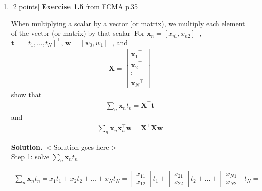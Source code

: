\documentclass[10pt]{article}
\begin{document}
\begin{enumerate}
\item \label{prob:5} [2 points]
{\bf Exercise 1.5} from FCMA p.35  %

When multiplying a scalar by a vector (or matrix), we multiply each element of the vector (or matrix) by that scalar.  For $\mathbf{x}_n = {[ x_{n1}, x_{n2} ]}^\top$, $\mathbf{t} = {[ t_1,...,t_N ]}^\top$, $\mathbf{w} = {[ w_0, w_1 ]}^\top$, and
\begin{eqnarray*}
\mathbf{X} = 
    \begin{bmatrix}
    {\mathbf{x}_{1}}^\top \\[0.3em]
    {\mathbf{x}_{2}}^\top \\[0.3em]
    \vdots \\[0.3em]
    {\mathbf{x}_{N}}^\top
    \end{bmatrix}
\end{eqnarray*}
show that
\begin{eqnarray*}
\sum_{n} \mathbf{x}_n t_n = \mathbf{X}^\top\mathbf{t}
\end{eqnarray*}
and
\begin{eqnarray*}
\sum_{n} \mathbf{x}_n \mathbf{x}_n ^\top \mathbf{w} = \mathbf{X}^\top\mathbf{X} \mathbf{w}
\end{eqnarray*}

{\bf Solution.} $<$Solution goes here$>$\\

Step 1: solve $\sum_{n} \mathbf{x}_n t_n$

\begin{eqnarray*}
\sum_{n} \mathbf{x}_n t_n = 
x_1t_1 + x_2t_2 + \dots + x_Nt_N =
    \begin{bmatrix}
	x_{11} \\[0.3em]
    x_{12}
    \end{bmatrix}
    t_1 +
    \begin{bmatrix}
	x_{21} \\[0.3em]
    x_{22}
    \end{bmatrix}
    t_2 +
    \dots +
    \begin{bmatrix}
	x_{N1} \\[0.3em]
    x_{N2}
    \end{bmatrix}
    t_N =
\end{eqnarray*}


\end{enumerate}
\end{document}
